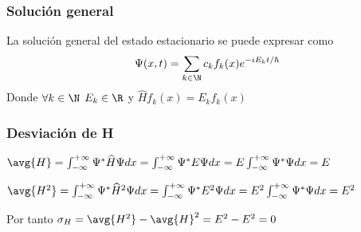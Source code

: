 \subsubsection{Solución general}
La solución general del estado estacionario se puede expresar como
\begin{equation}\label{solucion_general_estado_estacionario}
    \Psi(x,t)=\sum_{k\in\N}c_k f_k(x)e^{-iE_k t/\hbar}
\end{equation}
Donde $\forall k\in\N$ $E_k\in\R$ y $\widehat{H}f_k(x)=E_k f_k(x)$
\subsubsection{Desviación de H}
$\avg{H} = \int_{-\infty}^{+\infty}\Psi^* \widehat{H}\Psi dx = \int_{-\infty}^{+\infty}\Psi^* E\Psi dx=E\int_{-\infty}^{+\infty}\Psi^* \Psi dx = E$

$\avg{H^2} = \int_{-\infty}^{+\infty}\Psi^* \widehat{H}^2\Psi dx = \int_{-\infty}^{+\infty}\Psi^* E^2\Psi dx=E^2\int_{-\infty}^{+\infty}\Psi^* \Psi dx = E^2$

Por tanto $\sigma_H=\avg{H^2}-\avg{H}^2=E^2-E^2=0$
